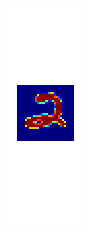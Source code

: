 \begin{frame}[plain]
\begin{figure}\vspace{-1.5cm}
\begin{subfigure}{0.2\textwidth}
\includegraphics[width=\textwidth]{mlp_input}


\end{subfigure}
\end{figure}
\end{frame}
